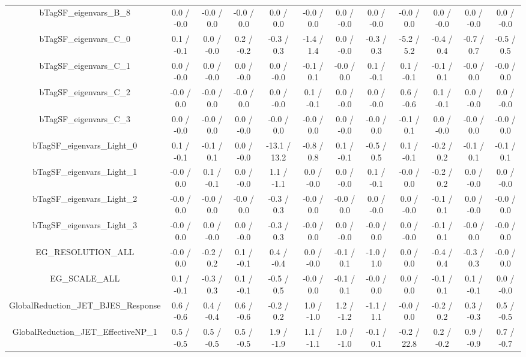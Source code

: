 \begin{table}[htbp]
\begin{center}
\begin{tabular}{|c|c|c|c|c|c|c|c|c|c|c|c|}
  bTagSF_eigenvars_B_8 & 0.0 / -0.0 & -0.0 / 0.0 & -0.0 / 0.0 & 0.0 / 0.0 & -0.0 / 0.0 & 0.0 / -0.0 & 0.0 / -0.0 & -0.0 / 0.0 & 0.0 / -0.0 & 0.0 / -0.0 & 0.0 / -0.0 \\ 
  bTagSF_eigenvars_C_0 & 0.1 / -0.1 & 0.0 / -0.0 & 0.2 / -0.2 & -0.3 / 0.3 & -1.4 / 1.4 & 0.0 / -0.0 & -0.3 / 0.3 & -5.2 / 5.2 & -0.4 / 0.4 & -0.7 / 0.7 & -0.5 / 0.5 \\ 
  bTagSF_eigenvars_C_1 & 0.0 / -0.0 & 0.0 / -0.0 & 0.0 / -0.0 & 0.0 / -0.0 & -0.1 / 0.1 & -0.0 / 0.0 & 0.1 / -0.1 & 0.1 / -0.1 & -0.1 / 0.1 & -0.0 / 0.0 & -0.0 / 0.0 \\ 
  bTagSF_eigenvars_C_2 & -0.0 / 0.0 & -0.0 / 0.0 & -0.0 / 0.0 & 0.0 / -0.0 & 0.1 / -0.1 & 0.0 / -0.0 & 0.0 / -0.0 & 0.6 / -0.6 & 0.1 / -0.1 & 0.0 / -0.0 & 0.0 / -0.0 \\ 
  bTagSF_eigenvars_C_3 & 0.0 / -0.0 & -0.0 / 0.0 & 0.0 / -0.0 & -0.0 / 0.0 & -0.0 / 0.0 & 0.0 / -0.0 & -0.0 / 0.0 & -0.1 / 0.1 & 0.0 / -0.0 & -0.0 / 0.0 & -0.0 / 0.0 \\ 
  bTagSF_eigenvars_Light_0 & 0.1 / -0.1 & -0.1 / 0.1 & 0.0 / -0.0 & -13.1 / 13.2 & -0.8 / 0.8 & 0.1 / -0.1 & -0.5 / 0.5 & 0.1 / -0.1 & -0.2 / 0.2 & -0.1 / 0.1 & -0.1 / 0.1 \\ 
  bTagSF_eigenvars_Light_1 & -0.0 / 0.0 & 0.1 / -0.1 & 0.0 / -0.0 & 1.1 / -1.1 & 0.0 / -0.0 & 0.0 / -0.0 & 0.1 / -0.1 & -0.0 / 0.0 & -0.2 / 0.2 & 0.0 / -0.0 & 0.0 / -0.0 \\ 
  bTagSF_eigenvars_Light_2 & -0.0 / 0.0 & -0.0 / 0.0 & -0.0 / 0.0 & -0.3 / 0.3 & -0.0 / 0.0 & -0.0 / 0.0 & 0.0 / -0.0 & 0.0 / -0.0 & -0.1 / 0.1 & 0.0 / -0.0 & -0.0 / 0.0 \\ 
  bTagSF_eigenvars_Light_3 & -0.0 / 0.0 & 0.0 / -0.0 & 0.0 / -0.0 & -0.3 / 0.3 & -0.0 / 0.0 & 0.0 / -0.0 & -0.0 / 0.0 & 0.0 / -0.0 & -0.1 / 0.1 & -0.0 / 0.0 & -0.0 / 0.0 \\ 
  EG_RESOLUTION_ALL & -0.0 / 0.0 & -0.2 / 0.2 & 0.1 / -0.1 & 0.4 / -0.4 & 0.0 / -0.0 & -0.1 / 0.1 & -1.0 / 1.0 & 0.0 / 0.0 & -0.4 / 0.4 & -0.3 / 0.3 & -0.0 / 0.0 \\ 
  EG_SCALE_ALL & 0.1 / -0.1 & -0.3 / 0.3 & 0.1 / -0.1 & -0.5 / 0.5 & -0.0 / 0.0 & -0.1 / 0.1 & -0.0 / 0.0 & 0.0 / 0.0 & -0.1 / 0.1 & 0.1 / -0.1 & 0.0 / -0.0 \\ 
  GlobalReduction_JET_BJES_Response & 0.6 / -0.6 & 0.4 / -0.4 & 0.6 / -0.6 & -0.2 / 0.2 & 1.0 / -1.0 & 1.2 / -1.2 & -1.1 / 1.1 & -0.0 / 0.0 & -0.2 / 0.2 & 0.3 / -0.3 & 0.5 / -0.5 \\ 
  GlobalReduction_JET_EffectiveNP_1 & 0.5 / -0.5 & 0.5 / -0.5 & 0.5 / -0.5 & 1.9 / -1.9 & 1.1 / -1.1 & 1.0 / -1.0 & -0.1 / 0.1 & -0.2 / 22.8 & 0.2 / -0.2 & 0.9 / -0.9 & 0.7 / -0.7 \\ 

\end{tabular}
\end{center}
\end{table}
